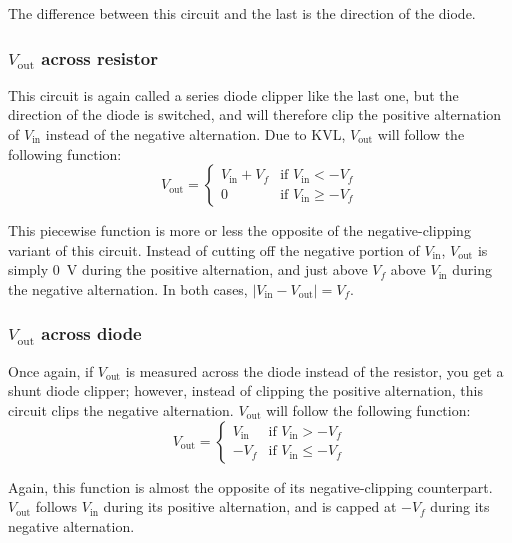 \documentclass{article}
\begin{document}
The difference between this circuit and the last is the direction
of the diode.

\subsubsection{\(V_\text{out}\) across resistor} This circuit
is again called a series diode clipper like the last one,
but the direction of the diode is switched, and will therefore
clip the positive alternation of \(V_\text{in}\) instead of the
negative alternation. Due to KVL, \(V_\text{out}\) will follow
the following function:
\begin{equation}
    V_\text{out} =
    \begin{cases}
        V_\text{in} + V_f & \text{if $V_\text{in} < -V_f$}\\
        0                 & \text{if $V_\text{in} \ge -V_f$}
    \end{cases}
\end{equation}

This piecewise function is more or less the opposite
of the negative-clipping variant of this circuit. Instead
of cutting off the negative portion of \(V_\text{in}\),
\(V_\text{out}\) is simply \SI{0}{V} during the positive
alternation, and just above \(V_f\) above \(V_\text{in}\)
during the negative alternation. In both cases,
\(|V_\text{in} - V_\text{out}| = V_f\).

\subsubsection{\(V_\text{out}\) across diode} Once again, if
\(V_\text{out}\) is measured across the diode instead of the
resistor, you get a shunt diode clipper; however, instead of
clipping the positive alternation, this circuit clips the
negative alternation. \(V_\text{out}\) will follow the
following function:
\begin{equation}
    V_\text{out} =
    \begin{cases}
        V_\text{in} & \text{if $V_\text{in} > -V_f$}\\
        -V_f         & \text{if $V_\text{in} \le -V_f$}
    \end{cases}
\end{equation}

Again, this function is almost the opposite of its negative-clipping
counterpart. \(V_\text{out}\) follows \(V_\text{in}\) during its
positive alternation, and is capped at \(-V_f\) during its negative
alternation.
\end{document}

